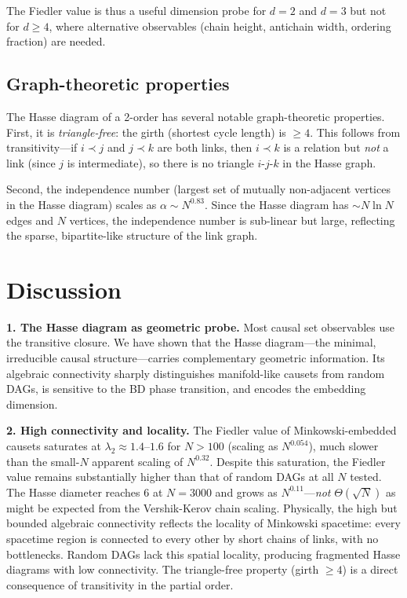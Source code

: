 \documentclass[aps,prd,twocolumn,superscriptaddress,nofootinbib]{revtex4-2}
\begin{document}
The Fiedler value is thus a useful dimension probe for $d = 2$ and $d = 3$ but not for $d \geq 4$, where alternative observables (chain height, antichain width, ordering fraction) are needed.

\subsection{Graph-theoretic properties}

The Hasse diagram of a 2-order has several notable graph-theoretic properties. First, it is \emph{triangle-free}: the girth (shortest cycle length) is $\geq 4$. This follows from transitivity---if $i \prec j$ and $j \prec k$ are both links, then $i \prec k$ is a relation but \emph{not} a link (since $j$ is intermediate), so there is no triangle $i$-$j$-$k$ in the Hasse graph.

Second, the independence number (largest set of mutually non-adjacent vertices in the Hasse diagram) scales as $\alpha \sim N^{0.83}$. Since the Hasse diagram has $\sim N \ln N$ edges and $N$ vertices, the independence number is sub-linear but large, reflecting the sparse, bipartite-like structure of the link graph.

\section{Discussion}

\textbf{1. The Hasse diagram as geometric probe.} Most causal set observables use the transitive closure. We have shown that the Hasse diagram---the minimal, irreducible causal structure---carries complementary geometric information. Its algebraic connectivity sharply distinguishes manifold-like causets from random DAGs, is sensitive to the BD phase transition, and encodes the embedding dimension.

\textbf{2. High connectivity and locality.} The Fiedler value of Minkowski-embedded causets saturates at $\lambda_2 \approx 1.4$--$1.6$ for $N > 100$ (scaling as $N^{0.054}$), much slower than the small-$N$ apparent scaling of $N^{0.32}$. Despite this saturation, the Fiedler value remains substantially higher than that of random DAGs at all $N$ tested. The Hasse diameter reaches 6 at $N = 3000$ and grows as $N^{0.11}$---\emph{not} $\Theta(\sqrt{N})$ as might be expected from the Vershik-Kerov chain scaling. Physically, the high but bounded algebraic connectivity reflects the locality of Minkowski spacetime: every spacetime region is connected to every other by short chains of links, with no bottlenecks. Random DAGs lack this spatial locality, producing fragmented Hasse diagrams with low connectivity. The triangle-free property (girth $\geq 4$) is a direct consequence of transitivity in the partial order.
\end{document}
